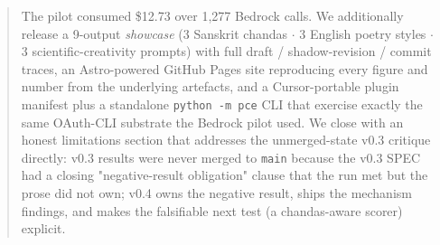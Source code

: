 \documentclass[11pt,a4paper]{article}
\begin{document}
\begin{abstract}
The pilot consumed \$12.73 over 1{,}277 Bedrock calls. We additionally release a 9-output \emph{showcase} (3 Sanskrit chandas $\cdot$ 3 English poetry styles $\cdot$ 3 scientific-creativity prompts) with full draft / shadow-revision / commit traces, an Astro-powered GitHub Pages site reproducing every figure and number from the underlying artefacts, and a Cursor-portable plugin manifest plus a standalone \texttt{python -m pce} CLI that exercise exactly the same OAuth-CLI substrate the Bedrock pilot used. We close with an honest limitations section that addresses the unmerged-state v0.3 critique directly: v0.3 results were never merged to \texttt{main} because the v0.3 SPEC had a closing "negative-result obligation" clause that the run met but the prose did not own; v0.4 owns the negative result, ships the mechanism findings, and makes the falsifiable next test (a chandas-aware scorer) explicit.
\end{abstract}

















\appendix










\end{document}
